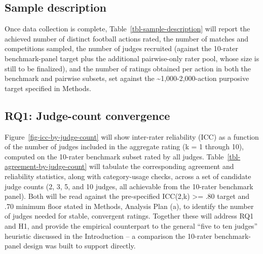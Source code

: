 \documentclass[
  12pt,
]{article}
\begin{document}
\subsection{Sample description}\label{sample-description}

Once data collection is complete, Table~\ref{tbl-sample-description}
will report the achieved number of distinct football actions rated, the
number of matches and competitions sampled, the number of judges
recruited (against the 10-rater benchmark-panel target plus the
additional pairwise-only rater pool, whose size is still to be
finalized), and the number of ratings obtained per action in both the
benchmark and pairwise subsets, set against the
\textasciitilde1,000-2,000-action purposive target specified in Methods.

\begin{table}

\caption{\label{tbl-sample-description}Description of the collected
sample: number of distinct football actions rated, number of matches and
competitions sampled, number of judges/raters recruited (against the
10-rater benchmark-panel target plus the additional pairwise-only rater
pool, size still to be finalized), and ratings per action (benchmark
vs.~pairwise subset), reported against the planned purposive target of
\textasciitilde1,000-2,000 actions.}

\centering{

}

\end{table}%

\subsection{RQ1: Judge-count
convergence}\label{rq1-judge-count-convergence}

Figure~\ref{fig-icc-by-judge-count} will show inter-rater reliability
(ICC) as a function of the number of judges included in the aggregate
rating (k = 1 through 10), computed on the 10-rater benchmark subset
rated by all judges. Table~\ref{tbl-agreement-by-judge-count} will
tabulate the corresponding agreement and reliability statistics, along
with category-usage checks, across a set of candidate judge counts (2,
3, 5, and 10 judges, all achievable from the 10-rater benchmark panel).
Both will be read against the pre-specified ICC(2,k) \textgreater= .80
target and .70 minimum floor stated in Methods, Analysis Plan (a), to
identify the number of judges needed for stable, convergent ratings.
Together these will address RQ1 and H1, and provide the empirical
counterpart to the general ``five to ten judges'' heuristic discussed in
the Introduction -- a comparison the 10-rater benchmark-panel design was
built to support directly.
\end{document}
